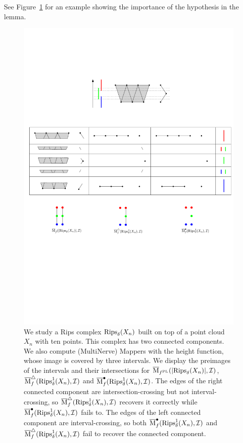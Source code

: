 See Figure~\ref{fig:CounterExampleEdge} for an example showing the importance of the hypothesis in the lemma.

\begin{figure}[!htb]
\includegraphics[width=17cm]{figures/CounterExampleEdge}
\caption[Interval- and intersection-crossing edges]{
We study a Rips complex $\mathrm{Rips}_\delta(X_n)$ built on top of a point cloud $X_n$ with ten points. 
This complex has two connected components. We also compute (MultiNerve) Mappers with the height function, whose image is covered by three intervals.
We display the preimages of the intervals and their intersections for  $\overline{\mathrm{M}}_{f^{\rm PL}}(|\mathrm{Rips}_\delta(X_n)|,\mathcal{I})$,  $\overline{\rm M}^\triangle_f(\mathrm{Rips}_\delta^1(X_n),\mathcal{I})$ 
and  $\overline{\rm M}^\bullet_f(\mathrm{Rips}_\delta^1(X_n),\mathcal{I})$.
The edges of the right connected component are intersection-crossing
but not interval-crossing, so $\overline{\rm M}^\triangle_f(\mathrm{Rips}_\delta^1(X_n),\mathcal{I})$ recovers it correctly
while $\overline{\rm M}^\bullet_f(\mathrm{Rips}_\delta^1(X_n),\mathcal{I})$ fails to.
The edges of the left connected component are interval-crossing, so both $\overline{\rm M}^\bullet_f(\mathrm{Rips}_\delta^1(X_n),\mathcal{I})$ and
 $\overline{\rm M}^\triangle_f(\mathrm{Rips}_\delta^1(X_n),\mathcal{I})$ fail to recover the connected component.}
\label{fig:CounterExampleEdge}
\end{figure}




